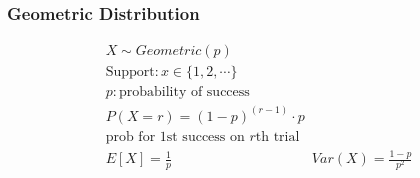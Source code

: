 \subsubsection*{Geometric Distribution}
\begin{tcolorbox}
\begin{gather*}
	X \sim Geometric(p)\\
	\text{Support}: x \in \{1, 2, \cdots\}\\
	p: \text{probability of success}\\
	P(X = r) = (1-p)^{(r-1)} \cdot p\\
	\text{prob for 1st success on $r$th trial}\\
	E[X] = \frac{1}{p} \hspace{10em} Var(X) = \frac{1-p}{p^2}
\end{gather*}	
\end{tcolorbox}
